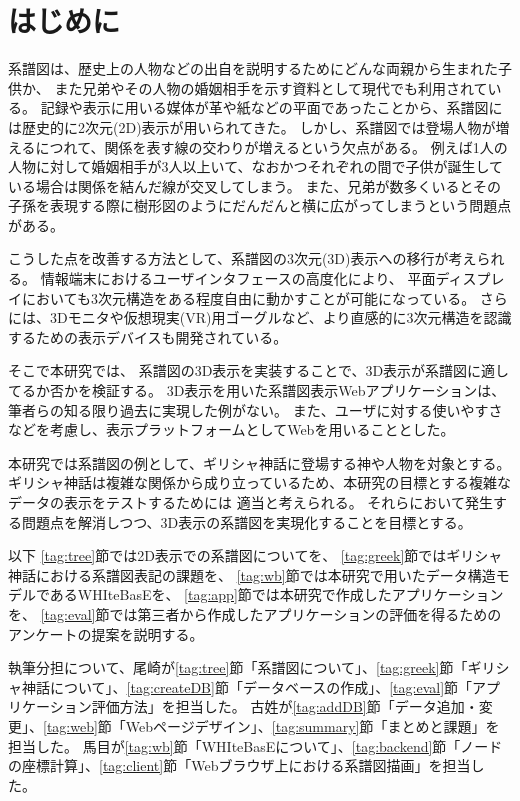\section{はじめに}
\label{tag:goal}
系譜図は、歴史上の人物などの出自を説明するためにどんな両親から生まれた子供か、
また兄弟やその人物の婚姻相手を示す資料として現代でも利用されている。
記録や表示に用いる媒体が革や紙などの平面であったことから、系譜図には歴史的に2次元(2D)表示が用いられてきた。
しかし、系譜図では登場人物が増えるにつれて、関係を表す線の交わりが増えるという欠点がある。
例えば1人の人物に対して婚姻相手が3人以上いて、なおかつそれぞれの間で子供が誕生している場合は関係を結んだ線が交叉してしまう。
また、兄弟が数多くいるとその子孫を表現する際に樹形図のようにだんだんと横に広がってしまうという問題点がある。

こうした点を改善する方法として、系譜図の3次元(3D)表示への移行が考えられる。
情報端末におけるユーザインタフェースの高度化により、
平面ディスプレイにおいても3次元構造をある程度自由に動かすことが可能になっている。
さらには、3Dモニタや仮想現実(VR)用ゴーグルなど、より直感的に3次元構造を認識するための表示デバイスも開発されている。

そこで本研究では、
系譜図の3D表示を実装することで、3D表示が系譜図に適してるか否かを検証する。
3D表示を用いた系譜図表示Webアプリケーションは、筆者らの知る限り過去に実現した例がない。
また、ユーザに対する使いやすさなどを考慮し、表示プラットフォームとしてWebを用いることとした。

本研究では系譜図の例として、ギリシャ神話に登場する神や人物を対象とする。
ギリシャ神話は複雑な関係から成り立っているため、本研究の目標とする複雑なデータの表示をテストするためには
適当と考えられる。
それらにおいて発生する問題点を解消しつつ、3D表示の系譜図を実現化することを目標とする。

以下
\ref{tag:tree}節では2D表示での系譜図についてを、
\ref{tag:greek}節ではギリシャ神話における系譜図表記の課題を、
\ref{tag:wb}節では本研究で用いたデータ構造モデルであるWHIteBasEを、
\ref{tag:app}節では本研究で作成したアプリケーションを、
\ref{tag:eval}節では第三者から作成したアプリケーションの評価を得るためのアンケートの提案を説明する。

執筆分担について、尾崎が\ref{tag:tree}節「系譜図について」、\ref{tag:greek}節「ギリシャ神話について」、\ref{tag:createDB}節「データベースの作成」、\ref{tag:eval}節「アプリケーション評価方法」を担当した。
古姓が\ref{tag:addDB}節「データ追加・変更」、\ref{tag:web}節「Webページデザイン」、\ref{tag:summary}節「まとめと課題」を担当した。
馬目が\ref{tag:wb}節「WHIteBasEについて」、\ref{tag:backend}節「ノードの座標計算」、\ref{tag:client}節「Webブラウザ上における系譜図描画」を担当した。
